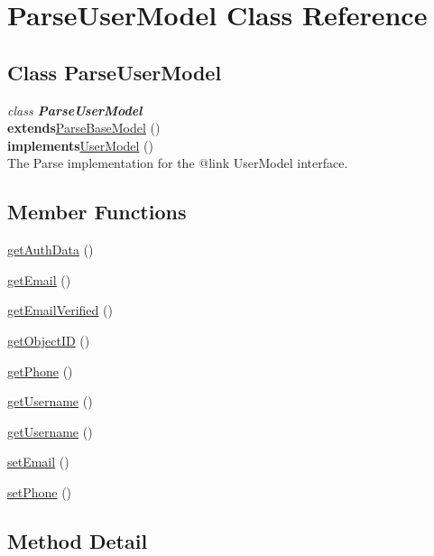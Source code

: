 \hypertarget{class_ParseUserModel.Android}{\section{ParseUserModel Class Reference}
\label{class_ParseUserModel.Android}
}

\subsection*{Class ParseUserModel}

\textit{class \textbf{ParseUserModel}}\\
\tab \textbf{extends}\hyperlink{class_ParseBaseModel.Android}{ParseBaseModel} ()\\
\tab \textbf{implements}\hyperlink{class_UserModel.Android}{UserModel} ()\\

The Parse implementation for the @{link UserModel} interface.

\subsection*{Member Functions}
\begin{DoxyCompactItemize}
\item 
\hyperlink{class_ParseUserModel.Android.getAuthData}{getAuthData} ()
\item 
\hyperlink{class_ParseUserModel.Android.getEmail}{getEmail} ()
\item 
\hyperlink{class_ParseUserModel.Android.getEmailVerified}{getEmailVerified} ()
\item 
\hyperlink{class_ParseUserModel.Android.getObjectID}{getObjectID} ()
\item 
\hyperlink{class_ParseUserModel.Android.getPhone}{getPhone} ()
\item 
\hyperlink{class_ParseUserModel.Android.getUsername}{getUsername} ()
\item 
\hyperlink{class_ParseUserModel.Android.getUsername2}{getUsername} ()
\item 
\hyperlink{class_ParseUserModel.Android.setEmail}{setEmail} ()
\item 
\hyperlink{class_ParseUserModel.Android.sePhone}{setPhone} ()
\end{DoxyCompactItemize}




\subsection{Method Detail}

